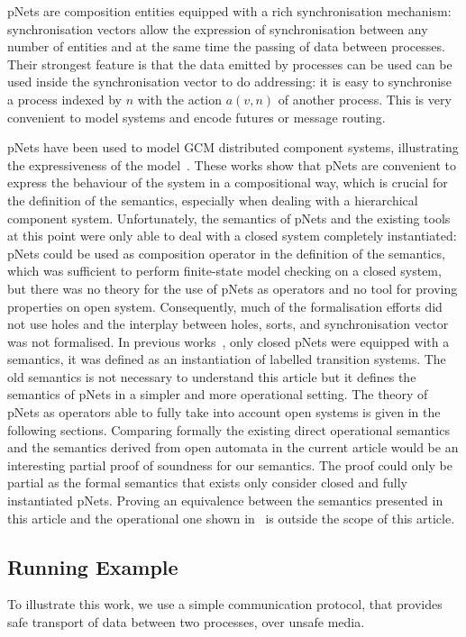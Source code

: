 \documentclass{lmcs}
\begin{document}
pNets are composition entities equipped with a rich synchronisation mechanism: synchronisation vectors allow the expression of synchronisation between any number of entities and at the same time the passing of data between processes. Their strongest feature is that the data emitted by processes can be used can be used inside the synchronisation vector to do addressing: it is easy to synchronise a process indexed by $n$ with the action $a(v,n)$ of another process. This is very convenient to model systems and encode futures or message routing. 

pNets have been used to model GCM distributed component systems, illustrating the expressiveness of the model~\cite{AmeurBoulifa2017}. 
These works show that pNets are convenient to express the behaviour of the system in a compositional way, which is crucial for the definition of the semantics, especially when dealing with a hierarchical component system. 
Unfortunately, the semantics of pNets and the existing tools at this point were only able to deal with a closed system completely instantiated: pNets could be used as composition operator in the definition of the semantics, which was sufficient to perform finite-state model checking on a closed system, but there was no theory for the use of pNets as operators and no tool for proving properties on open system. 
Consequently, much of the formalisation efforts did not use holes and the interplay between holes, sorts, and synchronisation vector was not formalised.
In previous works~\cite{AmeurBoulifa2017}, only closed pNets were equipped with a semantics, it was defined as an instantiation of labelled transition systems. The old semantics is not necessary to understand this article but it defines the semantics of pNets in a simpler and more operational setting. The theory of pNets as operators able to fully take into account open systems is given in the following sections. Comparing formally the existing direct operational semantics and the semantics derived from open automata in the current article would be an interesting partial proof of soundness for our semantics. The proof could only be partial as the formal semantics that exists only consider closed and fully instantiated pNets. Proving 
an equivalence between the semantics presented in this article and the operational one shown in~\cite{AmeurBoulifa2017} is outside the scope of this article.



\subsection{Running Example}
To illustrate this work, we use a simple communication protocol, that provides safe transport of data between two processes, over unsafe media. 
\end{document}
